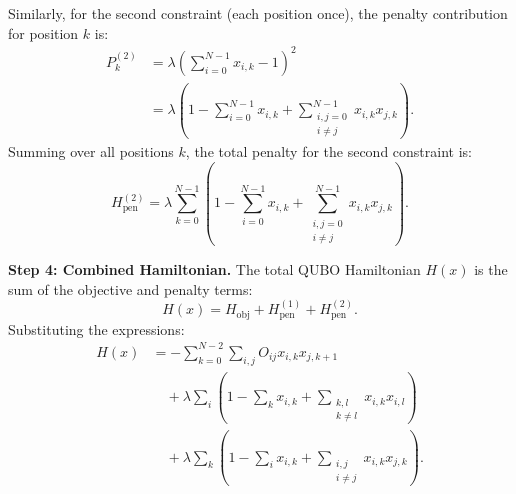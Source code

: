 \documentclass[12pt]{article}
\begin{document}
Similarly, for the second constraint (each position once), the penalty contribution for position $k$ is:
\begin{align}
    P_k^{(2)} &= \lambda \left( \sum_{i=0}^{N-1} x_{i,k} - 1 \right)^2 \\
    &= \lambda \left( 1 - \sum_{i=0}^{N-1} x_{i,k} + \sum_{\substack{i,j=0 \\ i \neq j}}^{N-1} x_{i,k} x_{j,k} \right).
\end{align}
Summing over all positions $k$, the total penalty for the second constraint is:
\begin{equation}
    H_{\text{pen}}^{(2)} = \lambda \sum_{k=0}^{N-1} \left( 1 - \sum_{i=0}^{N-1} x_{i,k} + \sum_{\substack{i,j=0 \\ i \neq j}}^{N-1} x_{i,k} x_{j,k} \right).
\end{equation}

\textbf{Step 4: Combined Hamiltonian.}
The total QUBO Hamiltonian $H(x)$ is the sum of the objective and penalty terms:
\begin{equation}
    H(x) = H_{\text{obj}} + H_{\text{pen}}^{(1)} + H_{\text{pen}}^{(2)}.
\end{equation}
Substituting the expressions:
\begin{align}
    H(x) &= -\sum_{k=0}^{N-2} \sum_{i,j} O_{ij} x_{i,k} x_{j,k+1} \nonumber \\
    &\quad + \lambda \sum_{i} \left( 1 - \sum_{k} x_{i,k} + \sum_{\substack{k,l \\ k \neq l}} x_{i,k} x_{i,l} \right) \nonumber \\
    &\quad + \lambda \sum_{k} \left( 1 - \sum_{i} x_{i,k} + \sum_{\substack{i,j \\ i \neq j}} x_{i,k} x_{j,k} \right).
\end{align}
\end{document}
